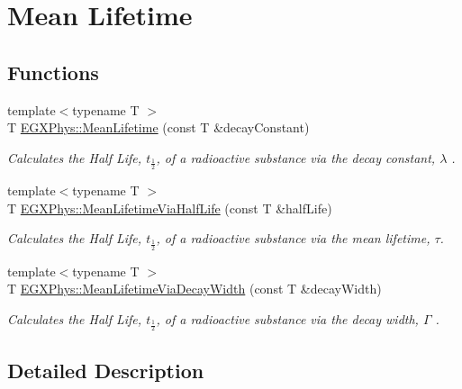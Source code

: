 \hypertarget{group___e_g_x_phys-_mean_lifetime}{}\section{Mean Lifetime}
\label{group___e_g_x_phys-_mean_lifetime}
\subsection*{Functions}
\begin{DoxyCompactItemize}
\item 
{\footnotesize template$<$typename T $>$ }\\T \mbox{\hyperlink{group___e_g_x_phys-_mean_lifetime_gaa9e3c2deedda4bc7a745568b06fc47eb}{E\+G\+X\+Phys\+::\+Mean\+Lifetime}} (const T \&decay\+Constant)
\begin{DoxyCompactList}\small\item\em Calculates the Half Life, $t_{\frac{1}{2}}$, of a radioactive substance via the decay constant, $\lambda$ . \end{DoxyCompactList}\item 
{\footnotesize template$<$typename T $>$ }\\T \mbox{\hyperlink{group___e_g_x_phys-_mean_lifetime_ga2586e148263e1f6c8ff89f269a0930ea}{E\+G\+X\+Phys\+::\+Mean\+Lifetime\+Via\+Half\+Life}} (const T \&half\+Life)
\begin{DoxyCompactList}\small\item\em Calculates the Half Life, $t_{\frac{1}{2}}$, of a radioactive substance via the mean lifetime, $\tau$. \end{DoxyCompactList}\item 
{\footnotesize template$<$typename T $>$ }\\T \mbox{\hyperlink{group___e_g_x_phys-_mean_lifetime_ga8a1dda4168b4b25db93bf1ae7832fd7e}{E\+G\+X\+Phys\+::\+Mean\+Lifetime\+Via\+Decay\+Width}} (const T \&decay\+Width)
\begin{DoxyCompactList}\small\item\em Calculates the Half Life, $t_{\frac{1}{2}}$, of a radioactive substance via the decay width, $\Gamma$ . \end{DoxyCompactList}\end{DoxyCompactItemize}


\subsection{Detailed Description}


